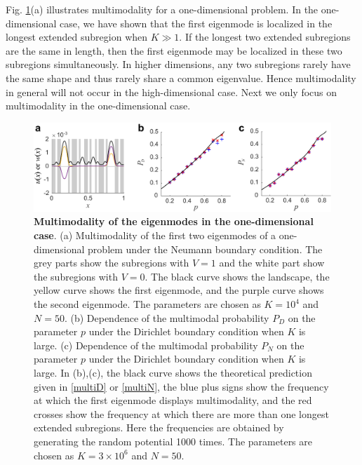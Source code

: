 \documentclass[a4paper,11pt]{article}
\begin{document}
Fig. \ref{fig4}(a) illustrates multimodality for a one-dimensional problem. In the one-dimensional case, we have shown that the first eigenmode is localized in the longest extended subregion when $K\gg 1$. If the longest two extended subregions are the same in length, then the first eigenmode may be localized in these two subregions simultaneously. In higher dimensions, any two subregions rarely have the same shape and thus rarely share a common eigenvalue. Hence multimodality in general will not occur in the high-dimensional case. Next we only focus on multimodality in the one-dimensional case.
\begin{figure}
\centering
\includegraphics[width=\linewidth]{Fig4}
\caption{\textbf{Multimodality of the eigenmodes in the one-dimensional case}. (a) Multimodality of the first two eigenmodes of a one-dimensional problem under the Neumann boundary condition. The grey parts show the subregions with $V = 1$ and the white part show the subregions with $V = 0$. The black curve shows the landscape, the yellow curve shows the first eigenmode, and the purple curve shows the second eigenmode. The parameters are chosen as $K = 10^4$ and $N = 50$.
(b) Dependence of the multimodal probability $P_D$ on the parameter $p$ under the Dirichlet boundary condition when $K$ is large. (c) Dependence of the multimodal probability $P_N$ on the parameter $p$ under the Dirichlet boundary condition when $K$ is large. In (b),(c), the black curve shows the theoretical prediction given in \eqref{multiD} or \eqref{multiN}, the blue plus signs show the frequency at which the first eigenmode displays multimodality, and the red crosses show the frequency at which there are more than one longest extended subregions. Here the frequencies are obtained by generating the random potential 1000 times. The parameters are chosen as $K = 3 \times 10^6$ and $N = 50$.}
\label{fig4}
\end{figure}
\end{document}
